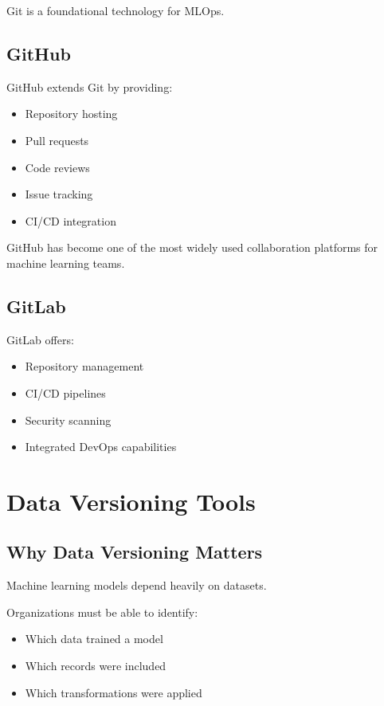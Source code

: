 Git is a foundational technology for MLOps.

\subsection{GitHub}

GitHub extends Git by providing:

\begin{itemize}
    \item Repository hosting
    \item Pull requests
    \item Code reviews
    \item Issue tracking
    \item CI/CD integration
\end{itemize}

GitHub has become one of the most widely used collaboration platforms for machine learning teams.

\subsection{GitLab}

GitLab offers:

\begin{itemize}
    \item Repository management
    \item CI/CD pipelines
    \item Security scanning
    \item Integrated DevOps capabilities
\end{itemize}

\section{Data Versioning Tools}

\subsection{Why Data Versioning Matters}

Machine learning models depend heavily on datasets.

Organizations must be able to identify:

\begin{itemize}
    \item Which data trained a model
    \item Which records were included
    \item Which transformations were applied
\end{itemize}

